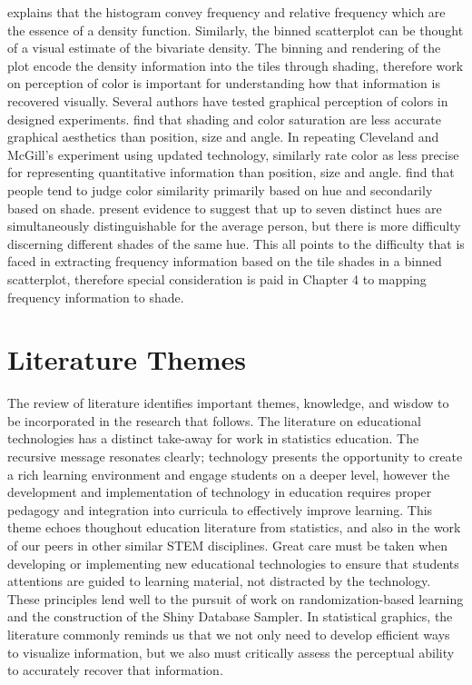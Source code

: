 \citet{scott1992} explains that the histogram convey frequency and relative frequency which are the essence of a density function. Similarly, the binned scatterplot can be thought of a visual estimate of the bivariate density. The binning and rendering of the plot encode the density information into the tiles through shading, therefore work on perception of color is important for understanding how that information is recovered visually. Several authors have tested graphical perception of colors in designed experiments. \citet{cleveland1984graphical} find that shading and color saturation are less accurate graphical aesthetics than position, size and angle. In repeating Cleveland and McGill's experiment using updated technology, \citet{heer2010crowdsourcing} similarly rate color as less precise for representing quantitative information than position, size and angle. \citet{demiralp2014learning} find that people tend to judge color similarity primarily based on hue and secondarily based on shade. \citet{healey1999large} present evidence to suggest that up to seven distinct hues are simultaneously distinguishable for the average person, but there is more difficulty discerning different shades of the same hue. This all points to the difficulty that is faced in extracting frequency information based on the tile shades in a binned scatterplot, therefore special consideration is paid in Chapter 4 to mapping frequency information to shade.


\section{Literature Themes}

The review of literature identifies important themes, knowledge, and wisdow to be incorporated in the research that follows. The literature on educational technologies has a distinct take-away for work in statistics education. The recursive message resonates clearly; technology presents the opportunity to create a rich learning environment and engage students on a deeper level, however the development and implementation of technology in education requires proper pedagogy and integration into curricula to effectively improve learning. This theme echoes thoughout education literature from statistics, and also in the work of our peers in other similar STEM disciplines. Great care must be taken when developing or implementing new educational technologies to ensure that students attentions are guided to learning material, not distracted by the technology. These principles lend well to the pursuit of work on randomization-based learning and the construction of the Shiny Database Sampler. In statistical graphics, the literature commonly reminds us that we not only need to develop efficient ways to visualize information, but we also must critically assess the perceptual ability to accurately recover that information. 
